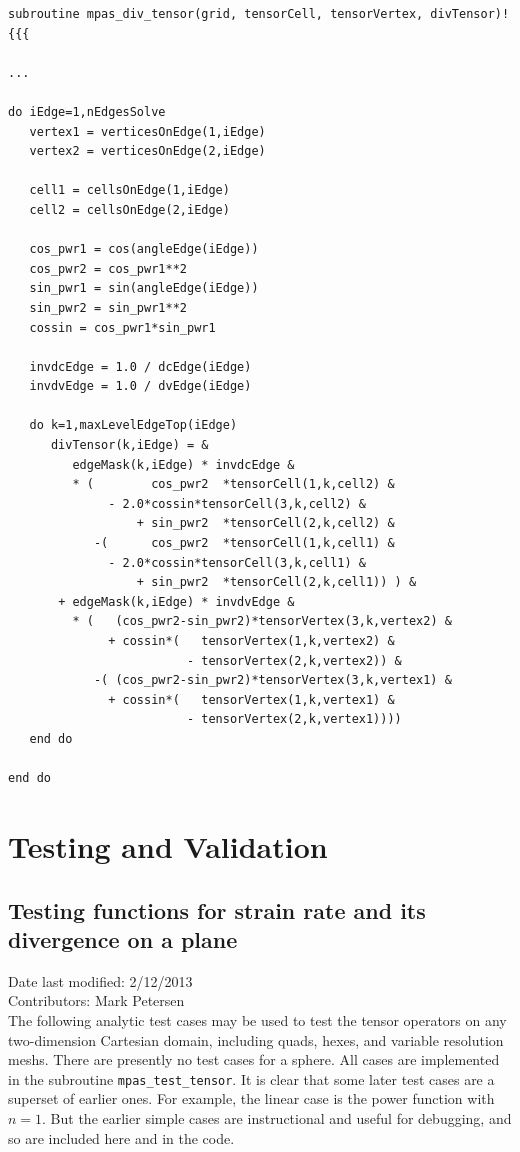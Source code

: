 \documentclass[11pt]{report}
\begin{document}
\begin{verbatim}
subroutine mpas_div_tensor(grid, tensorCell, tensorVertex, divTensor)!{{{

...

do iEdge=1,nEdgesSolve
   vertex1 = verticesOnEdge(1,iEdge)
   vertex2 = verticesOnEdge(2,iEdge)

   cell1 = cellsOnEdge(1,iEdge)
   cell2 = cellsOnEdge(2,iEdge)

   cos_pwr1 = cos(angleEdge(iEdge))
   cos_pwr2 = cos_pwr1**2
   sin_pwr1 = sin(angleEdge(iEdge))
   sin_pwr2 = sin_pwr1**2
   cossin = cos_pwr1*sin_pwr1

   invdcEdge = 1.0 / dcEdge(iEdge)
   invdvEdge = 1.0 / dvEdge(iEdge)

   do k=1,maxLevelEdgeTop(iEdge)
      divTensor(k,iEdge) = &
         edgeMask(k,iEdge) * invdcEdge &
         * (        cos_pwr2  *tensorCell(1,k,cell2) &
              - 2.0*cossin*tensorCell(3,k,cell2) &
                  + sin_pwr2  *tensorCell(2,k,cell2) &
            -(      cos_pwr2  *tensorCell(1,k,cell1) &
              - 2.0*cossin*tensorCell(3,k,cell1) &
                  + sin_pwr2  *tensorCell(2,k,cell1)) ) &
       + edgeMask(k,iEdge) * invdvEdge &
         * (   (cos_pwr2-sin_pwr2)*tensorVertex(3,k,vertex2) &
              + cossin*(   tensorVertex(1,k,vertex2) &
                         - tensorVertex(2,k,vertex2)) &
            -( (cos_pwr2-sin_pwr2)*tensorVertex(3,k,vertex1) &
              + cossin*(   tensorVertex(1,k,vertex1) &
                         - tensorVertex(2,k,vertex1))))
   end do

end do
\end{verbatim}


\chapter{Testing and Validation}

\section{Testing functions for strain rate and its divergence on a plane}
Date last modified: 2/12/2013 \\
Contributors: Mark Petersen \\

The following analytic test cases may be used to test the tensor operators on any two-dimension Cartesian domain, including quads, hexes, and variable resolution meshs.  There are presently no test cases for a sphere.  All cases are implemented in the subroutine \verb|mpas_test_tensor|.  It is clear that some later test cases are a superset of earlier ones.  For example, the linear case is the power function with $n=1$.  But the earlier simple cases are instructional and useful for debugging, and so are included here and in the code.
\end{document}
